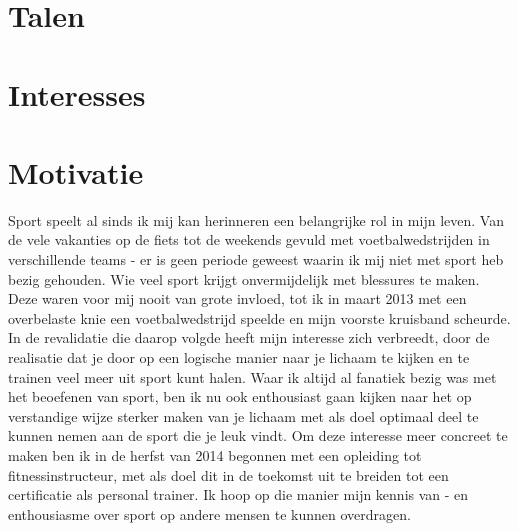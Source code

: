 \documentclass[11pt,a4paper,sans]{moderncv} %
\begin{document}
\section{Talen}

\section{Interesses}

\renewcommand{\listitemsymbol}{-~} %

\section{Motivatie}
Sport speelt al sinds ik mij kan herinneren een belangrijke rol in mijn
leven. Van de vele vakanties op de fiets tot de weekends gevuld met
voetbalwedstrijden in verschillende teams - er is geen periode geweest
waarin ik mij niet met sport heb bezig gehouden. Wie veel sport krijgt onvermijdelijk met blessures te maken. Deze waren voor mij nooit 
van grote invloed,
tot ik in maart 2013 met een overbelaste knie een voetbalwedstrijd speelde
en mijn voorste kruisband scheurde. In de revalidatie die daarop volgde
heeft mijn interesse zich verbreedt, door de realisatie dat je
door op een logische manier naar je lichaam 
te kijken en te trainen veel meer uit
sport kunt halen. Waar ik altijd al fanatiek bezig was met het beoefenen
van sport, ben ik nu ook enthousiast gaan kijken naar het op verstandige
wijze sterker maken van je lichaam met als doel optimaal deel te kunnen
nemen aan de sport die je leuk vindt. Om deze interesse meer
concreet te maken ben ik in de herfst van 2014 begonnen met een opleiding
tot fitnessinstructeur, met als doel dit in de toekomst uit te breiden
tot een certificatie als personal trainer. Ik hoop op die manier mijn
kennis van - en enthousiasme over sport op andere mensen te kunnen overdragen.
\end{document}
